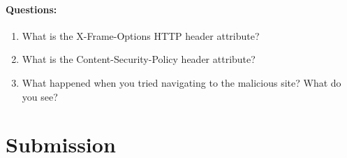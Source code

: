 

\paragraph{Questions:}
\begin{enumerate}
    \item What is the X-Frame-Options HTTP header attribute?
    \item What is the Content-Security-Policy header attribute?
    \item What happened when you tried navigating to the malicious site? What do you see?
\end{enumerate}







\section{Submission}

\begin{quote}
\seedsubmission
\end{quote}



